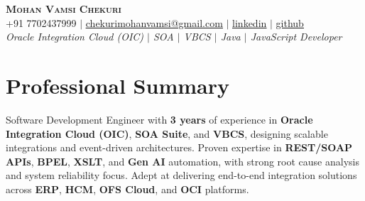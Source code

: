 \documentclass[letterpaper,11pt]{article}
\begin{document}
\begin{center}
    \textbf{\Huge \scshape Mohan Vamsi Chekuri} \\ \vspace{1pt}
    \small +91 7702437999 $|$ \href{mailto:chekurimohanvamsi@gmail.com}{\underline{chekurimohanvamsi@gmail.com}} $|$
    \href{https://www.linkedin.com/in/mvamsi73}{\underline{linkedin}} $|$
    \href{https://github.com}{\underline{github}}
    \\ \vspace{2pt}
    \small \textit{Oracle Integration Cloud (OIC) $|$ SOA $|$ VBCS $|$ Java $|$ JavaScript Developer}
\end{center}

\section{Professional Summary}
Software Development Engineer with \textbf{3 years} of experience in \textbf{Oracle Integration Cloud (OIC)}, \textbf{SOA Suite}, and \textbf{VBCS}, designing scalable integrations and event-driven architectures. Proven expertise in \textbf{REST/SOAP APIs}, \textbf{BPEL}, \textbf{XSLT}, and \textbf{Gen AI} automation, with strong root cause analysis and system reliability focus. Adept at delivering end-to-end integration solutions across \textbf{ERP}, \textbf{HCM}, \textbf{OFS Cloud}, and \textbf{OCI} platforms.
\end{document}
